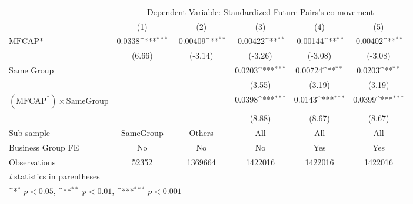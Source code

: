{
\def\sym#1{\ifmmode^{#1}\else\(^{#1}\)\fi}
\begin{tabular}{l*{5}{c}}
\hline\hline
                &\multicolumn{5}{c}{Dependent Variable: Standardized Future Pairs's co-movement}               \\\cmidrule(lr){2-6}
                &\multicolumn{1}{c}{(1)}         &\multicolumn{1}{c}{(2)}         &\multicolumn{1}{c}{(3)}         &\multicolumn{1}{c}{(4)}         &\multicolumn{1}{c}{(5)}         \\
\hline
$ \text{MFCAP*} $&   0.0338\sym{***}& -0.00409\sym{**} & -0.00422\sym{**} & -0.00144\sym{**} & -0.00402\sym{**} \\
                &   (6.66)         &  (-3.14)         &  (-3.26)         &  (-3.08)         &  (-3.08)         \\
[1em]
Same Group      &                  &                  &   0.0203\sym{***}&  0.00724\sym{**} &   0.0203\sym{**} \\
                &                  &                  &   (3.55)         &   (3.19)         &   (3.19)         \\
[1em]
 $ (\text{MFCAP}^*) \times {\text{SameGroup} }  $ &                  &                  &   0.0398\sym{***}&   0.0143\sym{***}&   0.0399\sym{***}\\
                &                  &                  &   (8.88)         &   (8.67)         &   (8.67)         \\
\hline
Sub-sample      &SameGroup         &   Others         &      All         &      All         &      All         \\
Business Group FE&       No         &       No         &       No         &      Yes         &      Yes         \\
Observations    &    52352         &  1369664         &  1422016         &  1422016         &  1422016         \\
\hline\hline
\multicolumn{6}{l}{\footnotesize \textit{t} statistics in parentheses}\\
\multicolumn{6}{l}{\footnotesize \sym{*} \(p<0.05\), \sym{**} \(p<0.01\), \sym{***} \(p<0.001\)}\\
\end{tabular}
}
